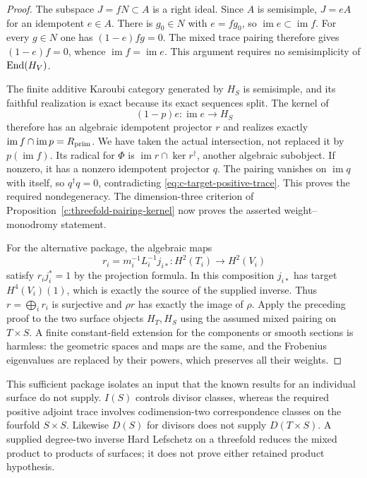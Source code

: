 \begin{proof}
The subspace $J=fN\subset A$ is a right ideal.
Since $A$ is semisimple, $J=eA$ for an idempotent $e\in A$.
There is $g_0\in N$ with $e=fg_0$, so
$\operatorname{im}e\subset\operatorname{im}f$.
For every $g\in N$ one has $(1-e)fg=0$.
The mixed trace pairing therefore gives $(1-e)f=0$, whence
$\operatorname{im}f=\operatorname{im}e$.
This argument requires no semisimplicity of $\operatorname{End}(H_V)$.

The finite additive Karoubi category generated by $H_S$
is semisimple, and its faithful realization is exact because
its exact sequences split. The kernel of
\[
 (1-p)e:\operatorname{im}e\longrightarrow H_S
\]
therefore has an algebraic idempotent projector $r$ and
realizes exactly
$\operatorname{im}f\cap\operatorname{im}p=R_{\rm prim}$.
We have taken the actual intersection, not replaced it
by $p(\operatorname{im}f)$.
Its radical for $\Phi$ is
$\operatorname{im}r\cap\ker r^\dagger$, another algebraic
subobject. If nonzero, it has a nonzero idempotent projector $q$.
The pairing vanishes on $\operatorname{im}q$ with itself,
so $q^\dagger q=0$, contradicting
\eqref{eq:c-target-positive-trace}.
This proves the required nondegeneracy. The dimension-three
criterion of Proposition~\ref{c:threefold-pairing-kernel}
now proves the asserted weight--monodromy statement.

For the alternative package, the algebraic maps
\[
 r_i=m_i^{-1}L_i^{-1}j_{i*}:H^2(T_i)\longrightarrow H^2(V_i)
\]
satisfy $r_i j_i^*=1$ by the projection formula.
In this composition $j_{i*}$ has target $H^4(V_i)(1)$,
which is exactly the source of the supplied inverse.
Thus $r=\bigoplus_i r_i$ is surjective and
$\rho r$ has exactly the image of $\rho$.
Apply the preceding proof to the two surface objects $H_T,H_S$
using the assumed mixed pairing on $T\times S$.
A finite constant-field extension for the components or smooth
sections is harmless: the geometric spaces and maps are the same,
and the Frobenius eigenvalues are replaced by their powers,
which preserves all their weights.
\end{proof}

This sufficient package isolates an input that the known results
for an individual surface do not supply.
$I(S)$ controls divisor classes, whereas the required
positive adjoint trace involves codimension-two correspondence
classes on the fourfold $S\times S$.
Likewise $D(S)$ for divisors does not supply $D(T\times S)$.
A supplied degree-two inverse Hard Lefschetz on a threefold
reduces the mixed product to products of surfaces; it does not
prove either retained product hypothesis.




